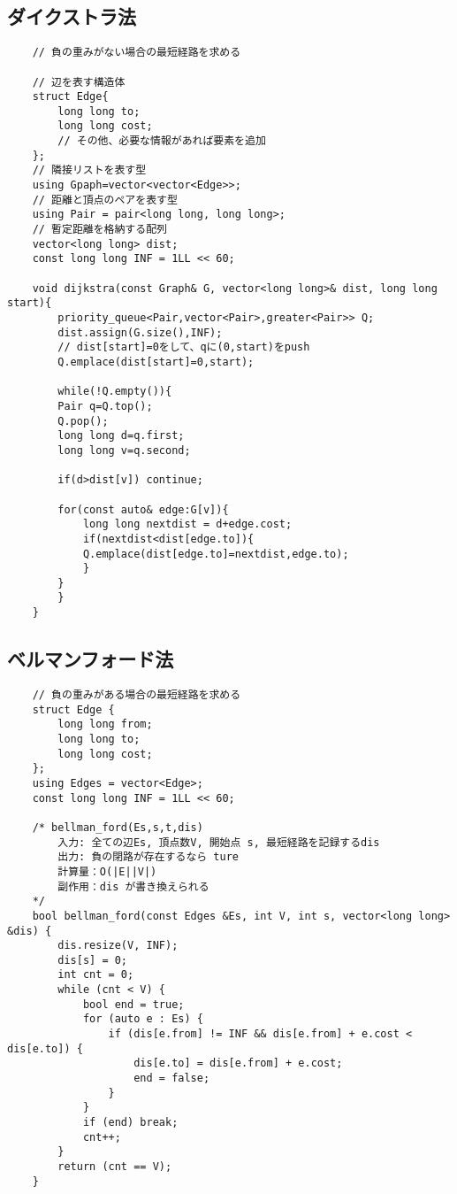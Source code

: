 \documentclass[a4paper, landscape, 9pt]{jarticle} %
\begin{document}
\begin{multicols*}{3}
    \subsection{ダイクストラ法}
    \begin{lstlisting}
    // 負の重みがない場合の最短経路を求める

    // 辺を表す構造体
    struct Edge{
        long long to;
        long long cost;
        // その他、必要な情報があれば要素を追加
    };
    // 隣接リストを表す型
    using Gpaph=vector<vector<Edge>>;
    // 距離と頂点のペアを表す型
    using Pair = pair<long long, long long>; 
    // 暫定距離を格納する配列
    vector<long long> dist; 
    const long long INF = 1LL << 60;
    
    void dijkstra(const Graph& G, vector<long long>& dist, long long start){
        priority_queue<Pair,vector<Pair>,greater<Pair>> Q;
        dist.assign(G.size(),INF);
        // dist[start]=0をして、qに(0,start)をpush
        Q.emplace(dist[start]=0,start); 
    
        while(!Q.empty()){
        Pair q=Q.top();
        Q.pop();
        long long d=q.first;
        long long v=q.second;
    
        if(d>dist[v]) continue;
    
        for(const auto& edge:G[v]){
            long long nextdist = d+edge.cost;
            if(nextdist<dist[edge.to]){
            Q.emplace(dist[edge.to]=nextdist,edge.to);
            }
        }
        }
    }
    \end{lstlisting}

    \subsection{ベルマンフォード法}
    \begin{lstlisting}
    // 負の重みがある場合の最短経路を求める
    struct Edge {
        long long from;
        long long to;
        long long cost;
    };
    using Edges = vector<Edge>;
    const long long INF = 1LL << 60;
    
    /* bellman_ford(Es,s,t,dis)
        入力: 全ての辺Es, 頂点数V, 開始点 s, 最短経路を記録するdis
        出力: 負の閉路が存在するなら ture
        計算量：O(|E||V|)
        副作用：dis が書き換えられる
    */
    bool bellman_ford(const Edges &Es, int V, int s, vector<long long> &dis) {
        dis.resize(V, INF);
        dis[s] = 0;
        int cnt = 0;
        while (cnt < V) {
            bool end = true;
            for (auto e : Es) {
                if (dis[e.from] != INF && dis[e.from] + e.cost < dis[e.to]) {
                    dis[e.to] = dis[e.from] + e.cost;
                    end = false;
                }
            }
            if (end) break;
            cnt++;
        }
        return (cnt == V);
    }    
    \end{lstlisting}




\end{multicols*}
\end{document}
